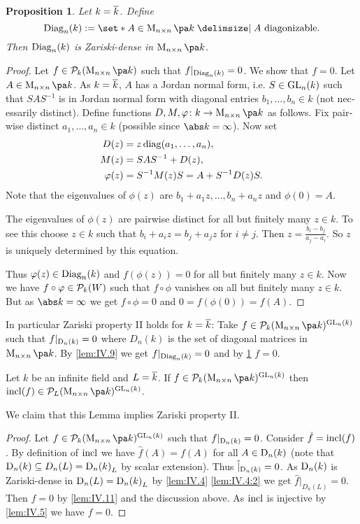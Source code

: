 \documentclass[12pt,a4paper]{scrartcl}
\theoremstyle{cplain}
\theoremstyle{cplain}
\theoremstyle{cplain}
\newtheorem{prop}[thmcounter]{Proposition}
\theoremstyle{definition}
\begin{document}
\begin{otherlanguage}{english}
\begin{prop} \label{prop:IV.10}
  Let $k=\overline k$. Define \[ \Diag_n(k) := \set*{A\in \Mat nk\given \text{$A$ diagonizable}}. \] Then $\operatorname{Diag}_n(k)$ is Zariski-dense in $\Mat nk$.
\end{prop}
\begin{proof}
  Let $f\in\Ps_k(\Mat nk)$ such that $f|_{\operatorname{Diag}_n(k)}=0$. We show that $f=0$. Let $A \in \Mat nk$. As $k=\overline k$, $A$ has a Jordan normal form, i.e. $S \in \operatorname{GL}_n(k)$ such that $SAS^{-1}$ is in Jordan normal form with diagonal entries $b_1,\ldots,b_n \in k$ (not necessarily distinct). Define functions $D,M,\phi\colon k\to \Mat nk$ as follows. Fix pairwise distinct $a_1,\ldots,a_n \in k$ (possible since $\abs k = \infty$). Now set
  \begin{align*}
    D(z) &= z\operatorname{diag}(a_1,\ldots,a_n), \\
    M(z) &= SAS^{-1} + D(z), \\
    \varphi(z) &= S^{-1}M(z)S = A + S^{-1}D(z)S.
  \end{align*}
  Note that the eigenvalues of $\phi(z)$ are $b_1 + a_1z,\ldots,b_n+a_nz$ and $\phi(0) = A$.
  
  The eigenvalues of $\phi(z)$ are pairwise distinct for all but finitely many $z\in k$. To see this choose $z\in k$ such that $b_i + a_iz = b_j+ a_jz$ for $i\neq j$. Then $z = \frac{b_i-b_j}{a_j-a_i}$. So $z$ is uniquely determined by this equation.
  
  Thus $\varphi(z) \in \operatorname{Diag}_n(k)$ and $f(\phi(z)) = 0$ for all but finitely many $z\in k$. Now we have $f\circ \varphi \in \mathcal{P}_k(W)$ such that $f\circ \phi$ vanishes on all but finitely many $z\in k$. But as $\abs k =\infty$ we get $f\circ\phi = 0$ and $0 = f(\phi(0)) = f(A)$.
\end{proof}

In particular Zariski property II holds for $k=\overline k$: Take $f\in\Ps_k(\Mat nk)^{\GL_n(k)}$ such that $f|_{\operatorname{D}_n(k)} = 0$ where $D_n(k)$ is the set of diagonal matrices in $\Mat nk$. By \cref{lem:IV.9} we get $f|_{\operatorname{Diag}_n(k)} = 0$ and by \cref{prop:IV.10} $f = 0$.

\begin{lem} \label{lem:IV.11}
  Let $k$ be an infinite field and $L=\overline k$. If $f\in\Ps_k(\Mat nk)^{\GL_n(k)}$ then $\incl(f)\in\Ps_L(\Mat nk)^{\GL_n(k)}$.
\end{lem}

\bigskip

We claim that this Lemma implies Zariski property II.
\begin{proof}
  Let $f\in\Ps_k(\Mat nk)^{\GL_n(k)}$ such that $f|_{\operatorname{D}_n(k)}=0$. Consider $\hat f = \operatorname{incl}(f)$. By definition of $\operatorname{incl}$ we have $\hat f(A) = f(A)$ for all $A \in \operatorname{D}_n(k)$ (note that $\operatorname{D}_n(k) \subseteq D_n(L) = {\operatorname{D}_n(k)}_L$ by scalar extension). Thus $\hat|_{\operatorname{D}_n(k)} = 0$. As $\operatorname{D}_n(k)$ is Zariski-dense in $\operatorname{D}_n(L) = {\operatorname{D}_n(k)}_L$ by \cref{lem:IV.4} \ref{lem:IV.4:2} we get $\hat f|_{D_n(L)} = 0$. Then $\hat f = 0$ by \cref{lem:IV.11} and the discussion above. As $\operatorname{incl}$ is injective by \cref{lem:IV.5} we have $f=0$.
\end{proof}


\end{otherlanguage}
\end{document}
